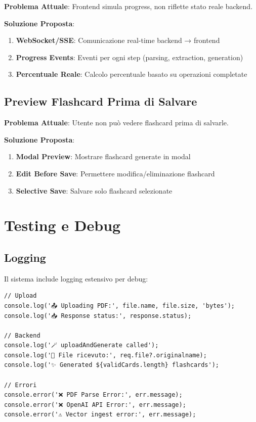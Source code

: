 \documentclass[11pt,a4paper]{article}
\begin{document}
\textbf{Problema Attuale}: Frontend simula progress, non riflette stato reale backend.

\textbf{Soluzione Proposta}:
\begin{enumerate}
    \item \textbf{WebSocket/SSE}: Comunicazione real-time backend → frontend
    \item \textbf{Progress Events}: Eventi per ogni step (parsing, extraction, generation)
    \item \textbf{Percentuale Reale}: Calcolo percentuale basato su operazioni completate
\end{enumerate}

\subsection{Preview Flashcard Prima di Salvare}

\textbf{Problema Attuale}: Utente non può vedere flashcard prima di salvarle.

\textbf{Soluzione Proposta}:
\begin{enumerate}
    \item \textbf{Modal Preview}: Mostrare flashcard generate in modal
    \item \textbf{Edit Before Save}: Permettere modifica/eliminazione flashcard
    \item \textbf{Selective Save}: Salvare solo flashcard selezionate
\end{enumerate}

\section{Testing e Debug}

\subsection{Logging}

Il sistema include logging estensivo per debug:

\begin{lstlisting}[caption=Logging Points]
// Upload
console.log('📤 Uploading PDF:', file.name, file.size, 'bytes');
console.log('📥 Response status:', response.status);

// Backend
console.log('🪄 uploadAndGenerate called');
console.log('📄 File ricevuto:', req.file?.originalname);
console.log('✨ Generated ${validCards.length} flashcards');

// Errori
console.error('❌ PDF Parse Error:', err.message);
console.error('❌ OpenAI API Error:', err.message);
console.error('⚠️ Vector ingest error:', err.message);
\end{lstlisting}
\end{document}
